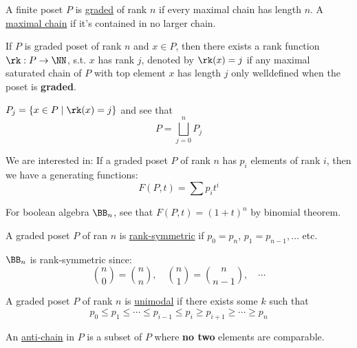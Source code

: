 \begin{definition}
	A finite poset \( P \) is \underline{graded} of rank \( n \) if every maximal chain has length \(
	n\). A \underline{maximal chain} if it's contained in no larger chain.
\end{definition}

\begin{definition}
	If \( P \) is graded poset of rank \( n \) and \( x\in P \), then there exists a rank function \(
	\rk : P \to \NN \), s.t. \( x \) has rank \( j \), denoted by \( \rk(x) = j \) if any maximal
	saturated chain of \( P \) with top element \( x \) has length \( j \) only welldefined when the poset is
	\textbf{graded}.
\end{definition}

\begin{definition}
	\( P_j = \{x\in P \; | \; \rk(x) = j\} \) and see that
	\[
		P = \bigsqcup_{j=0}^n P_j
	\]
\end{definition}
We are interested in: If a graded poset \( P \) of rank \( n \) has \( p_i \) elements of rank \( i \),
then we have a generating functions:
\[
	F(P,t) = \sum p_i t^i
\]

\begin{eg}
	For boolean algebra \( \BB_n \), see that \( F(P,t) = (1+t)^n \) by binomial theorem.
\end{eg}

\begin{definition}
	A graded poset \( P \) of ran \( n \) is \underline{rank-symmetric} if \( p_0 = p_n \), \( p_1 =
	p_{n-1}, \ldots \) etc.
\end{definition}

\begin{eg}
	\( \BB_n \) is rank-symmetric since:
	\[
		\binom{n}{0} = \binom{n}{n}, \quad  \binom{n}{1} = \binom{n}{n-1}, \quad \cdots
	\]
\end{eg}

\begin{definition}
	A graded poset \( P \) of rank \( n \) is \underline{unimodal} if there exists some \( k \) such
	that
	\[
		p_0 \leq p_1 \leq \cdots \leq p_{i-1} \leq p_i \geq p_{i+1} \geq \cdots \geq p_n
	\]
\end{definition}

\begin{definition}
	An \underline{anti-chain} in \( P \) is a subset of \( P \) where \textbf{no two} elements are
	comparable.
\end{definition}

